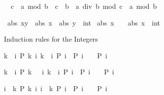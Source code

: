 \begin{isabellebody}
\begin{isamarkuptext}
\begin{isabelle}%
{}\ {\isacharless}\ c\ {\isasymLongrightarrow}\ a\ mod\ {\isacharparenleft}b\ {\isacharasterisk}\ c{\isacharparenright}\ {\isacharequal}\ b\ {\isacharasterisk}\ {\isacharparenleft}a\ div\ b\ mod\ c{\isacharparenright}\ {\isacharplus}\ a\ mod\ b%
\end{isabelle}
%
\end{isamarkuptext}%
\isamarkuptrue%
\ {\isachardoublequote}abs\ {\isacharparenleft}x{\isacharplus}y{\isacharparenright}\ {\isasymle}\ abs\ x\ {\isacharplus}\ abs\ {\isacharparenleft}y\ {\isacharcolon}{\isacharcolon}\ int{\isacharparenright}{\isachardoublequote}\isanewline
\isamarkupfalse%
\isanewline
\isanewline
\isamarkupfalse%
\ {\isachardoublequote}abs\ {\isacharparenleft}{}{\isacharasterisk}x{\isacharparenright}\ {\isacharequal}\ {}\ {\isacharasterisk}\ abs\ {\isacharparenleft}x\ {\isacharcolon}{\isacharcolon}\ int{\isacharparenright}{\isachardoublequote}\isanewline
\isamarkupfalse%
\isamarkupfalse%
%
\begin{isamarkuptext}%
Induction rules for the Integers

\begin{isabelle}%
{\isasymlbrakk}k\ {\isasymle}\ i{\isacharsemicolon}\ P\ k{\isacharsemicolon}\ {\isasymAnd}i{\isachardot}\ {\isasymlbrakk}k\ {\isasymle}\ i{\isacharsemicolon}\ P\ i{\isasymrbrakk}\ {\isasymLongrightarrow}\ P\ {\isacharparenleft}i\ {\isacharplus}\ {}{\isacharparenright}{\isasymrbrakk}\ {\isasymLongrightarrow}\ P\ i%
\end{isabelle}

\begin{isabelle}%
{\isasymlbrakk}k\ {\isacharless}\ i{\isacharsemicolon}\ P\ {\isacharparenleft}k\ {\isacharplus}\ {}{\isacharparenright}{\isacharsemicolon}\ {\isasymAnd}i{\isachardot}\ {\isasymlbrakk}k\ {\isacharless}\ i{\isacharsemicolon}\ P\ i{\isasymrbrakk}\ {\isasymLongrightarrow}\ P\ {\isacharparenleft}i\ {\isacharplus}\ {}{\isacharparenright}{\isasymrbrakk}\ {\isasymLongrightarrow}\ P\ i%
\end{isabelle}

\begin{isabelle}%
{\isasymlbrakk}i\ {\isasymle}\ k{\isacharsemicolon}\ P\ k{\isacharsemicolon}\ {\isasymAnd}i{\isachardot}\ {\isasymlbrakk}i\ {\isasymle}\ k{\isacharsemicolon}\ P\ i{\isasymrbrakk}\ {\isasymLongrightarrow}\ P\ {\isacharparenleft}i\ {\isacharminus}\ {}{\isacharparenright}{\isasymrbrakk}\ {\isasymLongrightarrow}\ P\ i%
\end{isabelle}


\end{isamarkuptext}
\end{isabellebody}
